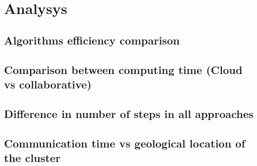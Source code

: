 \chapter{Analysys}

\section{Algorithms efficiency comparison}


\section{Comparison between computing time (Cloud vs collaborative)}


\section{Difference in number of steps in all approaches}


\section{Communication time vs geological location of the cluster}
